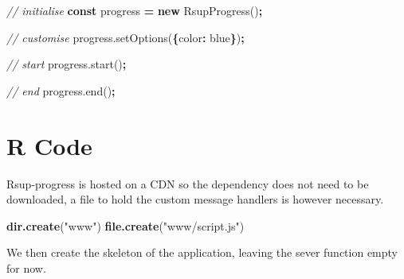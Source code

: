 \documentclass[
]{krantz}
\makeatletter
\newenvironment{Shaded}{\begin{snugshade}}{\end{snugshade}}
\newcommand{\AttributeTok}[1]{\textcolor[rgb]{0.61,0.61,0.61}{#1}}
\newcommand{\CommentTok}[1]{\textcolor[rgb]{0.37,0.37,0.37}{\textit{#1}}}
\newcommand{\DataTypeTok}[1]{\textcolor[rgb]{0.27,0.27,0.27}{#1}}
\newcommand{\KeywordTok}[1]{\textcolor[rgb]{0.27,0.27,0.27}{\textbf{#1}}}
\newcommand{\NormalTok}[1]{#1}
\newcommand{\OperatorTok}[1]{\textcolor[rgb]{0.43,0.43,0.43}{\textbf{#1}}}
\newcommand{\StringTok}[1]{\textcolor[rgb]{0.5,0.5,0.5}{#1}}
\newcommand{\VariableTok}[1]{\textcolor[rgb]{0,0,0}{#1}}
\newenvironment{kframe}{%
\medskip{}
\setlength{\fboxsep}{.8em}
 \def\at@end@of@kframe{}%
 \ifinner\ifhmode%
  \def\at@end@of@kframe{\end{minipage}}%
  \begin{minipage}{\columnwidth}%
 \fi\fi%
 \def\FrameCommand##1{\hskip\@totalleftmargin \hskip-\fboxsep
 \colorbox{shadecolor}{##1}\hskip-\fboxsep
     \hskip-\linewidth \hskip-\@totalleftmargin \hskip\columnwidth}%
 \MakeFramed {\advance\hsize-\width
   \@totalleftmargin\z@ \linewidth\hsize
   \@setminipage}}%
 {\par\unskip\endMakeFramed%
 \at@end@of@kframe}
\renewenvironment{Shaded}{\begin{kframe}}{\end{kframe}}
\makeatother
\begin{document}
\begin{Shaded}
\begin{Highlighting}[]
\CommentTok{// initialise}
\KeywordTok{const}\NormalTok{ progress }\OperatorTok{=} \KeywordTok{new} \AttributeTok{RsupProgress}\NormalTok{()}\OperatorTok{;}

\CommentTok{// customise}
\VariableTok{progress}\NormalTok{.}\AttributeTok{setOptions}\NormalTok{(}\OperatorTok{\{}\DataTypeTok{color}\OperatorTok{:} \StringTok{\textquotesingle{}blue\textquotesingle{}}\OperatorTok{\}}\NormalTok{)}\OperatorTok{;}

\CommentTok{// start}
\VariableTok{progress}\NormalTok{.}\AttributeTok{start}\NormalTok{()}\OperatorTok{;}

\CommentTok{// end}
\VariableTok{progress}\NormalTok{.}\AttributeTok{end}\NormalTok{()}\OperatorTok{;}
\end{Highlighting}
\end{Shaded}

\hypertarget{progress-r-code}{%
\section{R Code}\label{progress-r-code}}

Rsup-progress is hosted on a CDN so the dependency does not need to be downloaded, a file to hold the custom message handlers is however necessary.

\begin{Shaded}
\begin{Highlighting}[]
\KeywordTok{dir.create}\NormalTok{(}\StringTok{"www"}\NormalTok{)}
\KeywordTok{file.create}\NormalTok{(}\StringTok{"www/script.js"}\NormalTok{)}
\end{Highlighting}
\end{Shaded}

We then create the skeleton of the application, leaving the sever function empty for now.
\end{document}
